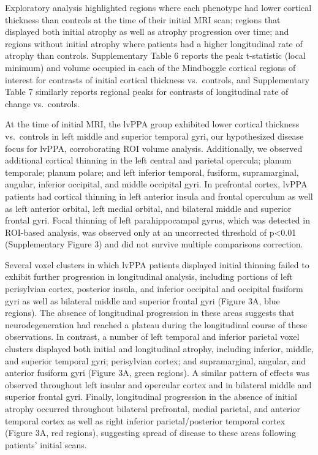 \documentclass[]{article}
\begin{document}
Exploratory analysis highlighted regions where each phenotype had lower
cortical thickness than controls at the time of their initial MRI scan;
regions that displayed both initial atrophy as well as atrophy
progression over time; and regions without initial atrophy where
patients had a higher longitudinal rate of atrophy than controls.
Supplementary Table 6 reports the peak t-statistic (local minimum) and
volume occupied in each of the Mindboggle cortical regions of interest
for contrasts of initial cortical thickness vs.~controls, and
Supplementary Table 7 similarly reports regional peaks for contrasts of
longitudinal rate of change vs.~controls.

At the time of initial MRI, the lvPPA group exhibited lower cortical
thickness vs.~controls in left middle and superior temporal gyri, our
hypothesized disease focus for lvPPA, corroborating ROI volume analysis.
Additionally, we observed additional cortical thinning in the left
central and parietal opercula; planum temporale; planum polare; and left
inferior temporal, fusiform, supramarginal, angular, inferior occipital,
and middle occipital gyri. In prefrontal cortex, lvPPA patients had
cortical thinning in left anterior insula and frontal operculum as well
as left anterior orbital, left medial orbital, and bilateral middle and
superior frontal gyri. Focal thinning of left parahippocampal gyrus,
which was detected in ROI-based analysis, was observed only at an
uncorrected threshold of p\textless{}0.01 (Supplementary Figure 3) and
did not survive multiple comparisons correction.

Several voxel clusters in which lvPPA patients displayed initial
thinning failed to exhibit further progression in longitudinal analysis,
including portions of left perisylvian cortex, posterior insula, and
inferior occipital and occipital fusiform gyri as well as bilateral
middle and superior frontal gyri (Figure 3A, blue regions). The absence
of longitudinal progression in these areas suggests that
neurodegeneration had reached a plateau during the longitudinal course
of these observations. In contrast, a number of left temporal and
inferior parietal voxel clusters displayed both initial and longitudinal
atrophy, including inferior, middle, and superior temporal gyri;
perisylvian cortex; and supramarginal, angular, and anterior fusiform
gyri (Figure 3A, green regions). A similar pattern of effects was
observed throughout left insular and opercular cortex and in bilateral
middle and superior frontal gyri. Finally, longitudinal progression in
the absence of initial atrophy occurred throughout bilateral prefrontal,
medial parietal, and anterior temporal cortex as well as right inferior
parietal/posterior temporal cortex (Figure 3A, red regions), suggesting
spread of disease to these areas following patients' initial scans.
\end{document}
